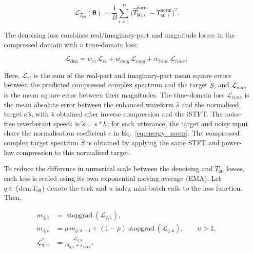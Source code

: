 \documentclass[a4paper,fleqn]{cas-sc}
\begin{document}
\begin{equation}
\mathcal{L}_{T_{60}}(\boldsymbol{\theta}) = \frac{1}{B}\sum_{i=1}^{B}\bigl(\hat{T}_{60,i}^{\mathrm{norm}} - T_{60,i}^{\mathrm{norm}}\bigr)^{2}. \tag{19}\label{eq:t60_loss}
\end{equation}



The denoising loss combines real/imaginary-part and magnitude losses in the compressed domain with a time-domain loss:



\begin{equation}
\mathcal{L}_{\text{den}} = w_{ri}\,\mathcal{L}_{ri} + w_{mag}\,\mathcal{L}_{mag} + w_{time}\,\mathcal{L}_{time}, \tag{20}\label{eq:denoise_loss}
\end{equation}



\noindent Here, $\mathcal{L}_{ri}$ is the sum of the real-part and imaginary-part mean square errors between the predicted compressed complex spectrum and the target $\tilde{S}$, and $\mathcal{L}_{mag}$ is the mean square error between their magnitudes. The time-domain loss $\mathcal{L}_{time}$ is the mean absolute error between the enhanced waveform $\hat s$ and the normalised target $c\,\tilde s$, with $\hat s$ obtained after inverse compression and the iSTFT. The noise-free reverberant speech is $\tilde s=s\ast h$; for each utterance, the target and noisy input share the normalisation coefficient $c$ in Eq.~\eqref{eq:energy_norm}. The compressed complex target spectrum $\tilde{S}$ is obtained by applying the same STFT and power-law compression to this normalised target.



To reduce the difference in numerical scale between the denoising and $T_{60}$ losses, each loss is scaled using its own exponential moving average (EMA). Let $q\in\{\mathrm{den},T_{60}\}$ denote the task and $u$ index mini-batch calls to the loss function. Then,



\begin{equation*}
\begin{aligned}
m_{q,1}&=\operatorname{stopgrad}(\mathcal{L}_{q,1}),\\
m_{q,u}&=\rho\,m_{q,u-1}+(1-\rho)\operatorname{stopgrad}(\mathcal{L}_{q,u}),\qquad u>1,\\
\mathcal{L}_{q,u}^{*}&=\frac{\mathcal{L}_{q,u}}{m_{q,u}+\varepsilon_{\mathrm{EMA}}}.
\end{aligned}
\end{equation*}
\end{document}

